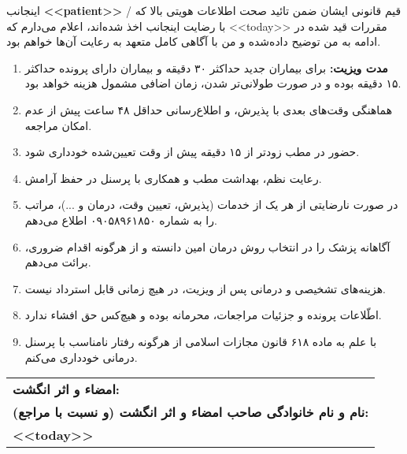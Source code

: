 \documentclass[12pt]{article}
\begin{document}
\normalfont
\begin{spacing}{1.2}
اینجانب
 \textbf{<<patient>>} \faSquare[regular] / قیم قانونی ایشان \faSquare[regular]
 ضمن تائید صحت اطلاعات هویتی بالا که با رضایت اینجانب اخذ شده‌اند، اعلام می‌دارم که 
 <<today>>
 مقررات قید شده در ادامه به من توضیح داده‌شده و من با آگاهی کامل متعهد به رعایت آن‌ها خواهم بود.
\end{spacing}

\vspace{-0.25cm}

\begin{enumerate}
  \item \textbf{مدت ویزیت:} برای بیماران جدید حداکثر ۳۰ دقیقه و بیماران دارای پرونده حداکثر ۱۵ دقیقه بوده و در صورت طولانی‌تر شدن، زمان اضافی مشمول هزینه خواهد بود.
  \item هماهنگی وقت‌های بعدی با پذیرش، و اطلاع‌رسانی حداقل ۴۸ ساعت پیش از عدم امکان مراجعه.
  \item حضور در مطب زودتر از ۱۵ دقیقه پیش از وقت تعیین‌شده خودداری شود.
  \item رعایت نظم، بهداشت مطب و همکاری با پرسنل در حفظ آرامش.
  \item در صورت نارضایتی از هر یک از خدمات (پذیرش، تعیین وقت، درمان و ...)، مراتب را به شماره ۰۹۰۵۸۹۶۱۸۵۰ اطلاع می‌دهم.
  \item آگاهانه پزشک را در انتخاب روش درمان امین دانسته و از هرگونه اقدام ضروری، برائت می‌دهم.
  \item هزینه‌های تشخیصی و درمانی پس از ویزیت، در هیچ زمانی قابل استرداد نیست.
  \item اطّلاعات پرونده و جزئیات مراجعات، محرمانه بوده و هیچ‌کس حق افشاء ندارد.
  \item با علم به ماده ۶۱۸ قانون مجازات اسلامی از هرگونه رفتار نامناسب با پرسنل درمانی خودداری می‌کنم.
\end{enumerate}




\begin{tabularx}{\textwidth}{X}

  \textbf{امضاء و اثر انگشت:} \\
  \vspace{1cm}
  \textbf{نام و نام خانوادگی صاحب امضاء و اثر انگشت (و نسبت با مراجع): }\\
  \textbf{<<today>>}

\end{tabularx}

\newpage
\end{document}

